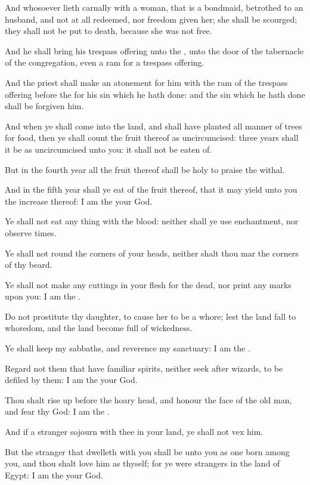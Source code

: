 \Verse And whosoever lieth carnally with a woman, that is a bondmaid, betrothed to an husband, and not at all redeemed, nor freedom given her; she shall be scourged; they shall not be put to death, because she was not free.

\Verse And he shall bring his trespass offering unto the \LORD, unto the door of the tabernacle of the congregation, even a ram for a trespass offering.

\Verse And the priest shall make an atonement for him with the ram of the trespass offering before the \LORD for his sin which he hath done: and the sin which he hath done shall be forgiven him.

\Verse And when ye shall come into the land, and shall have planted all manner of trees for food, then ye shall count the fruit thereof as uncircumcised: three years shall it be as uncircumcised unto you: it shall not be eaten of.

\Verse But in the fourth year all the fruit thereof shall be holy to praise the \LORD withal.

\Verse And in the fifth year shall ye eat of the fruit thereof, that it may yield unto you the increase thereof: I am the \LORD your God.

\Verse Ye shall not eat any thing with the blood: neither shall ye use enchantment, nor observe times.

\Verse Ye shall not round the corners of your heads, neither shalt thou mar the corners of thy beard.

\Verse Ye shall not make any cuttings in your flesh for the dead, nor print any marks upon you: I am the \LORD.

\Verse Do not prostitute thy daughter, to cause her to be a whore; lest the land fall to whoredom, and the land become full of wickedness.

\Verse Ye shall keep my sabbaths, and reverence my sanctuary: I am the \LORD.

\Verse Regard not them that have familiar spirits, neither seek after wizards, to be defiled by them: I am the \LORD your God.

\Verse Thou shalt rise up before the hoary head, and honour the face of the old man, and fear thy God: I am the \LORD.

\Verse And if a stranger sojourn with thee in your land, ye shall not vex him.

\Verse But the stranger that dwelleth with you shall be unto you as one born among you, and thou shalt love him as thyself; for ye were strangers in the land of Egypt: I am the \LORD your God.

